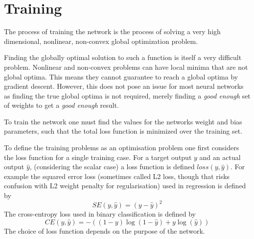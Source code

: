 \documentclass[12pt,parskip]{komatufte}
\begin{document}
\section{Training}
The process of training the network is the process of solving a very high dimensional, nonlinear, non-convex global optimization problem.


Finding the globally optimal solution to such a function is itself a very difficult problem.
Nonlinear and non-convex problems can have local minima that are not global optima.
This means they cannot guarantee to reach a global optima by gradient descent.
However, this does not pose an issue for most neural networks as finding the true global optima is not required, merely finding a \emph{good enough} set of weights to get a \emph{good enough} result.

To train the network one must find the values for the networks weight and bias parameters, such that the total loss function is minimized over the training set.

To define the training problems as an optimisation problem one first considers the loss function for a single training case.
For a target output $y$ and an actual output $\hat{y}$, (considering the scalar case) a loss function is defined $loss(y, \hat{y})$.
For example the squared error loss (sometimes called L2 loss, though that risks confusion with L2 weight penalty for regularisation) used in regression is defined by
\begin{equation}
	SE(y, \hat{y})=(y-\hat{y})^2
\end{equation}
The cross-entropy loss used in binary classification is defined by
\begin{equation}
	CE(y, \hat{y})=-\left((1-y)\log (1-\hat{y}) + y\log (\hat{y})\right)
\end{equation}
The choice of loss function depends on the purpose of the network.
\end{document}
